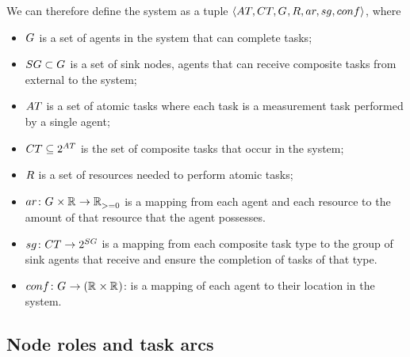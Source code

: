 We can therefore define the system as a tuple $\langle \setAtomicTask{}{}, \setCompositeTask{}{},  \setAgents{}{}, \setResource{}{}, ar, sg, conf \rangle$, where
\begin{itemize}
	\item $G_{}^{}$ is a set of agents in the system that can complete tasks;
	\item $\setSinkAgents{}{} \subset \setAgents{}{}$ is a set of sink nodes, agents that can receive composite tasks from external to the system;
	\item $\setAtomicTask{}{}$ is a set of atomic tasks where each task is a measurement task performed by a single agent;
	\item $\setCompositeTask{}{} \subseteq \powerSetSymbol{\setAtomicTask{}{}}{}{}$ is the set of composite tasks that occur in the system;
	\item $\setResource{}{}$ is a set of resources needed to perform atomic tasks;
	  \item $\formalAgentResources{}{}$ is a mapping from each agent and each resource to the amount of that resource that the agent possesses.
	\item $\formalSinkMapping{}{}$ is a mapping from each composite task type to the group of sink agents that receive and ensure the completion of tasks of that type.
	\item $\formalDeployment{}{}$: is a mapping of each agent to their location in the system.
\end{itemize}

\subsection{Node roles and task arcs}
\newcommand{\formalSinkRole}[2]{
	\functionFormal{sink}
	{\setAtomicTask{}{}}
	{\setAgents{}{}}
}
\newcommand{\formalSenseRole}[2]{
	\functionFormal{sensor}
	{\setAtomicTask{}{}}
	{\setAgents{}{}}
}
\newcommand{\formalActiveRole}[2]{
	\functionFormal{active}
	{\setAtomicTask{}{}}
	{\powerSetAgents{}{}}
}
\newcommand{\formalIdleRole}[2]{
	\functionFormal{idle_{\setTime{}{}}}
	{\setAtomicTask{}{}}
	{\powerSetAgents{}{}}
}
\newcommand{\formalSleepRole}[2]{
	\functionFormal{sink_{\setTime{}{}}}
	{\setAtomicTask{}{}}
	{\powerSetAgents{}{}}
}
\newcommand{\functionSinkRole}[2]{\functionSignature{sink}{\varAtomicTask{}{}}}
	
\newcommand{\functionSenseRole}[2]{\functionSignature{sensor}{\varAtomicTask{}{}}}
\newcommand{\functionActiveRole}[2]{\functionSignature{active_{#1}}{\varAtomicTask{}{}}}
\newcommand{\functionIdleRole}[2]{\functionSignature{idle}{\varAtomicTask{}{}}}
\newcommand{\functionSleepRole}[2]{\functionSignature{sleep}{\varAtomicTask{}{}}}

